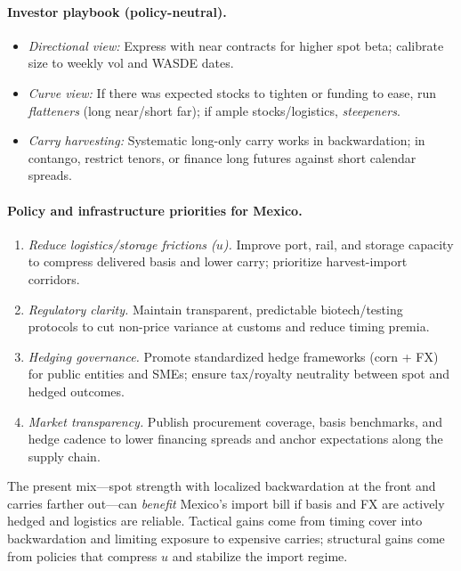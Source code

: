 \documentclass[11pt,a4paper]{article} %
\begin{document}
\paragraph{Investor playbook (policy-neutral).}
\begin{itemize}
  \item \textit{Directional view:} Express with near contracts for higher spot beta; calibrate size to weekly vol and WASDE dates.
  \item \textit{Curve view:} If there was expected stocks to tighten or funding to ease, run \emph{flatteners} (long near/short far); if ample stocks/logistics, \emph{steepeners}.
  \item \textit{Carry harvesting:} Systematic long-only carry works in backwardation; in contango, restrict tenors, or finance long futures against short calendar spreads.
\end{itemize}

\paragraph{Policy and infrastructure priorities for Mexico.}
\begin{enumerate}
  \item \textit{Reduce logistics/storage frictions (\(u\)).} Improve port, rail, and storage capacity to compress delivered basis and lower carry; prioritize harvest-import corridors.
  \item \textit{Regulatory clarity.} Maintain transparent, predictable biotech/testing protocols to cut non-price variance at customs and reduce timing premia.
  \item \textit{Hedging governance.} Promote standardized hedge frameworks (corn + FX) for public entities and SMEs; ensure tax/royalty neutrality between spot and hedged outcomes.
  \item \textit{Market transparency.} Publish procurement coverage, basis benchmarks, and hedge cadence to lower financing spreads and anchor expectations along the supply chain.
\end{enumerate}

\noindent
The present mix—spot strength with localized backwardation at the front and carries farther out—can \emph{benefit} Mexico's import bill if basis and FX are actively hedged and logistics are reliable. Tactical gains come from timing cover into backwardation and limiting exposure to expensive carries; structural gains come from policies that compress \(u\) and stabilize the import regime.
\end{document}
